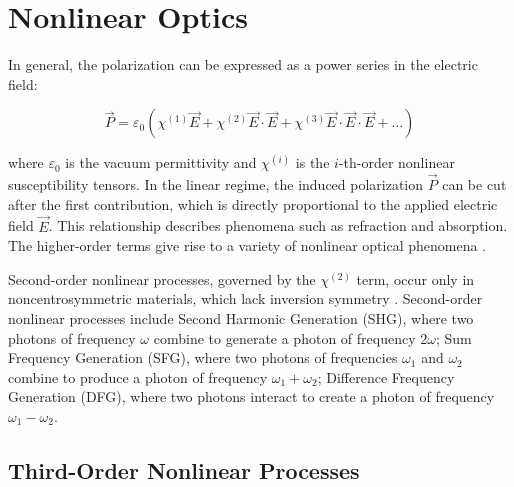 \section{Nonlinear Optics}
\label{sec:nonlinear_optics}


In general, the polarization can be expressed as a power series in the electric field:

\begin{equation}
	\vec{P} = \varepsilon_0 (\chi^{(1)} \vec{E} + \chi^{(2)} \vec{E} \cdot \vec{E} + \chi^{(3)} \vec{E} \cdot \vec{E} \cdot \vec{E} + \ldots)
	\label{eq:nonlinear_polarization}
\end{equation}

\noindent 
where $\varepsilon_0$ is the vacuum permittivity and $\chi^{(i)}$ is the $i$-th-order nonlinear susceptibility tensors. 
In the linear regime, the induced polarization $\vec{P}$ can be cut after the first contribution, which is directly proportional to the applied electric field $\vec{E}$.
This relationship describes phenomena such as refraction and absorption.
The higher-order terms give rise to a variety of nonlinear optical phenomena \cite{boyd2008contents}.

\noindent 
{}
Second-order nonlinear processes, governed by the $\chi^{(2)}$ term, occur only in noncentrosymmetric materials, which lack inversion symmetry \cite{rao2018overviewsecondthird,boyd2008chapter1nonlinear}.  Second-order nonlinear processes include Second Harmonic Generation (SHG), where two photons of frequency $\omega$ combine to generate a photon of frequency $2\omega$; Sum Frequency Generation (SFG), where two photons of frequencies $\omega_1$ and $\omega_2$ combine to produce a photon of frequency $\omega_1 + \omega_2$; Difference Frequency Generation (DFG), where two photons interact to create a photon of frequency $\omega_1 - \omega_2$.


\subsection{Third-Order Nonlinear Processes}
\label{subsec:third_order}

